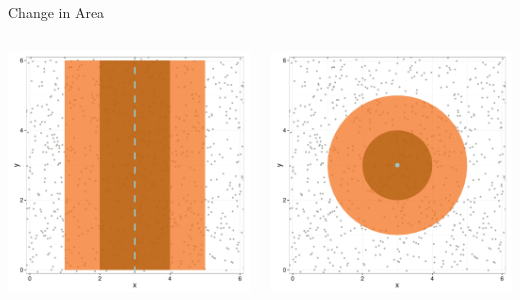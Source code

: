 \documentclass{beamer}
\begin{document}
\begin{frame}{Change in Area}

	\begin{columns}
		\begin{column}{0.48\textwidth}
		\includegraphics[width=\textwidth]{../images/slides-LTr.pdf}
		\end{column}
		\begin{column}{0.48\textwidth}
		\includegraphics[width=\textwidth]{../images/slides-VCPr.pdf}
		\end{column}
	\end{columns}

\end{frame}
\end{document}
